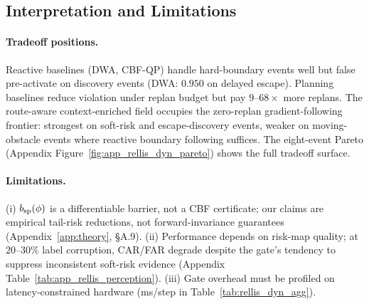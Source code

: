 \begin{table}[t]
\centering
\caption{\textbf{Highway mechanism ablation} (200 paired seeds).
The lateral channel enables passing; the TTC channel prevents using it
when the adjacent maneuver is unsafe.}
\label{tab:highway_mechanism}
\scriptsize\setlength{\tabcolsep}{3pt}\renewcommand{\arraystretch}{1.08}
\end{table}

\subsection{Interpretation and Limitations}
\label{sec:exp_interpretation}

\paragraph{Tradeoff positions.}
Reactive baselines (DWA, CBF-QP) handle hard-boundary events well but
false pre-activate on discovery events (DWA: $0.950$ on delayed escape).
Planning baselines reduce violation under replan budget but pay
$9$--$68\times$ more replans.
The route-aware context-enriched field occupies the zero-replan gradient-following frontier:
strongest on soft-risk and escape-discovery events, weaker on
moving-obstacle events where reactive boundary following suffices.
The eight-event Pareto (Appendix Figure~\ref{fig:app_rellis_dyn_pareto})
shows the full tradeoff surface.

\paragraph{Limitations.}
(i) $b_{\rm sp}(\phi)$ is a differentiable barrier, not a CBF
certificate; our claims are empirical tail-risk reductions, not
forward-invariance guarantees
(Appendix~\ref{app:theory}, \S A.9).
(ii) Performance depends on risk-map quality; at $20$--$30\%$ label
corruption, CAR/FAR degrade despite the gate's tendency to suppress
inconsistent soft-risk evidence (Appendix
Table~\ref{tab:app_rellis_perception}).
(iii) Gate overhead must be profiled on latency-constrained hardware
(ms/step in Table~\ref{tab:rellis_dyn_agg}).


